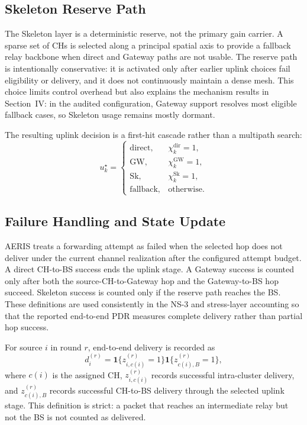 \documentclass[conference]{IEEEtran}
\begin{document}
\subsection{Skeleton Reserve Path}
The Skeleton layer is a deterministic reserve, not the primary gain carrier. A sparse set of CHs is selected along a principal spatial axis to provide a fallback relay backbone when direct and Gateway paths are not usable. The reserve path is intentionally conservative: it is activated only after earlier uplink choices fail eligibility or delivery, and it does not continuously maintain a dense mesh. This choice limits control overhead but also explains the mechanism results in Section~IV: in the audited configuration, Gateway support resolves most eligible fallback cases, so Skeleton usage remains mostly dormant.

The resulting uplink decision is a first-hit cascade rather than a multipath search:
\begin{equation}
u_k^\star=\begin{cases}
\mathrm{direct}, & \chi_k^{\mathrm{dir}}=1,\\
\mathrm{GW}, & \chi_k^{\mathrm{GW}}=1,\\
\mathrm{Sk}, & \chi_k^{\mathrm{Sk}}=1,\\
\mathrm{fallback}, & \text{otherwise}.
\end{cases}
\end{equation}

\subsection{Failure Handling and State Update}
AERIS treats a forwarding attempt as failed when the selected hop does not deliver under the current channel realization after the configured attempt budget. A direct CH-to-BS success ends the uplink stage. A Gateway success is counted only after both the source-CH-to-Gateway hop and the Gateway-to-BS hop succeed. Skeleton success is counted only if the reserve path reaches the BS. These definitions are used consistently in the NS-3 and stress-layer accounting so that the reported end-to-end PDR measures complete delivery rather than partial hop success.

For source $i$ in round $r$, end-to-end delivery is recorded as
\begin{equation}
d_i^{(r)}=\mathbf{1}\{z_{i,c(i)}^{(r)}=1\}\mathbf{1}\{z_{c(i),B}^{(r)}=1\},
\end{equation}
where $c(i)$ is the assigned CH, $z_{i,c(i)}^{(r)}$ records successful intra-cluster delivery, and $z_{c(i),B}^{(r)}$ records successful CH-to-BS delivery through the selected uplink stage. This definition is strict: a packet that reaches an intermediate relay but not the BS is not counted as delivered.
\end{document}
